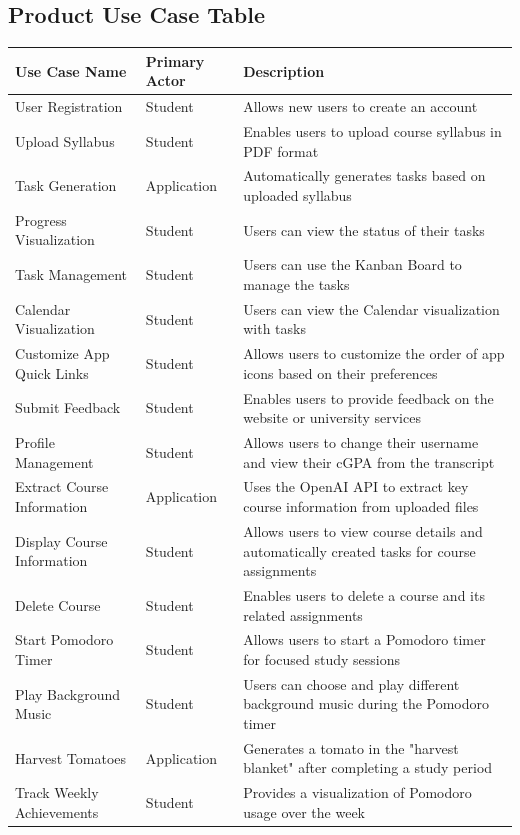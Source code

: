 \documentclass[12pt]{article}
\begin{document}
\subsection{Product Use Case Table}
\begin{longtable}{ |p{3cm}|p{5cm}|p{5cm}|}
    \hline
    Use Case Name & Primary Actor & Description \\
    \hline
    User Registration & Student & Allows new users to create an account \\
    \hline
    Upload Syllabus & Student & Enables users to upload course syllabus in PDF format \\
    \hline
    Task Generation & Application & Automatically generates tasks based on uploaded syllabus \\
    \hline
    Progress Visualization & Student & Users can view the status of their tasks \\
    \hline
    Task Management & Student & Users can use the Kanban Board to manage the tasks\\
    \hline
    Calendar Visualization & Student & Users can view the Calendar visualization with tasks\\
    \hline
    Customize App Quick Links & Student & Allows users to customize the order of app icons based on their preferences \\
    \hline
    Submit Feedback & Student & Enables users to provide feedback on the website or university services \\
    \hline
    Profile Management & Student & Allows users to change their username and view their cGPA from the transcript \\
    \hline
    Extract Course Information & Application & Uses the OpenAI API to extract key course information from uploaded files \\
    \hline
    Display Course Information & Student & Allows users to view course details and automatically created tasks for course assignments \\
    \hline
    Delete Course & Student & Enables users to delete a course and its related assignments \\
    \hline
    Start Pomodoro Timer & Student & Allows users to start a Pomodoro timer for focused study sessions \\
    \hline
    Play Background Music & Student & Users can choose and play different background music during the Pomodoro timer \\
    \hline
    Harvest Tomatoes & Application & Generates a tomato in the "harvest blanket" after completing a study period \\
    \hline
    Track Weekly Achievements & Student & Provides a visualization of Pomodoro usage over the week \\
    \hline
    
\end{longtable}
\end{document}
